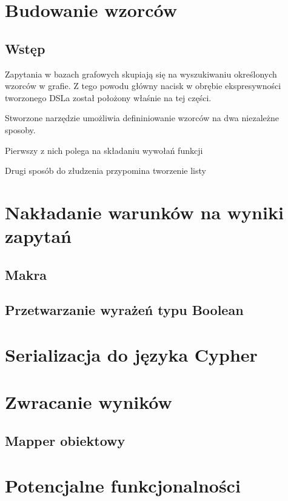 \documentclass[brudnopis]{xmgr}
\begin{document}
\section{Budowanie wzorców}

\subsection{Wstęp}

Zapytania w bazach grafowych skupiają się na wyszukiwaniu określonych wzorców w grafie. Z tego powodu główny nacisk w obrębie ekspresywności tworzonego DSLa został położony właśnie na tej części.

Stworzone narzędzie umożliwia defininiowanie wzorców na dwa niezależne sposoby.

Pierwszy z nich polega na składaniu wywołań funkcji


Drugi sposób do złudzenia przypomina tworzenie listy 


\section{Nakładanie warunków na wyniki zapytań}

\subsection{Makra}

\subsection{Przetwarzanie wyrażeń typu Boolean}

\section{Serializacja do języka Cypher}

\section{Zwracanie wyników}

\subsection{Mapper obiektowy}

\section{Potencjalne funkcjonalności}
\end{document}
